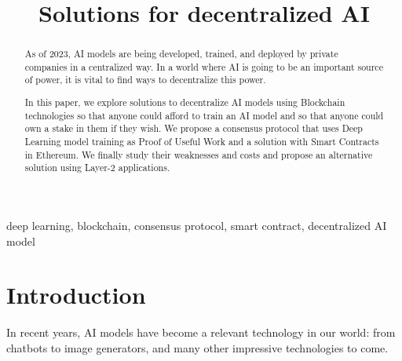 \documentclass[conference]{IEEEtran}
\begin{document}
\title{Solutions for decentralized AI\\
}

\author{
\and
{}
\and
{}
}
\maketitle

\begin{abstract}
As of 2023, AI models are being developed, trained, and deployed by private companies in a centralized way. In a world where AI is going to be an important source of power, it is vital to find ways to decentralize this power.

In this paper, we explore solutions to decentralize AI models using Blockchain technologies so that anyone could afford to train an AI model and so that anyone could own a stake in them if they wish. We propose a consensus protocol that uses Deep Learning model training as Proof of Useful Work and a solution with Smart Contracts in Ethereum. We finally study their weaknesses and costs and propose an alternative solution using Layer-2 applications.
\end{abstract}

\begin{IEEEkeywords}
deep learning, blockchain, consensus protocol, smart contract, decentralized AI model
\end{IEEEkeywords}

\section{Introduction}
In recent years, AI models have become a relevant technology in our world: from chatbots to image generators, and many other impressive technologies to come.
\end{document}

